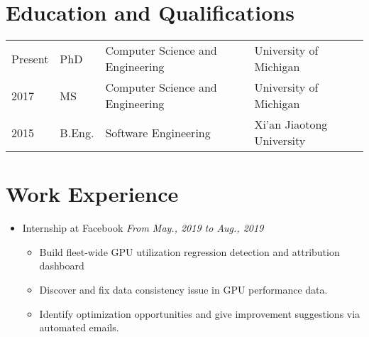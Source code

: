 \documentclass[letterpaper,11pt]{article}
\begin{document}
\maketitle

\section{Education and Qualifications}

\begin{tabular}{llll}
    Present        & PhD  & Computer Science and Engineering & University of Michigan \\
    2017           & MS   & Computer Science and Engineering & University of Michigan \\
    2015           & B.Eng. & Software Engineering & Xi'an Jiaotong University
\end{tabular}

\begin{publications}
\end{publications}

\section{Work Experience}
\begin{itemize}
    \item Internship at Facebook \hfill \textit{From May., 2019 to Aug., 2019}
    \begin{itemize}
        \item Build fleet-wide GPU utilization regression detection and attribution dashboard
        \item Discover and fix data consistency issue in GPU performance data.
        \item Identify optimization opportunities and give improvement suggestions via automated 
emails.
    \end{itemize}

\end{itemize}
\end{document}
